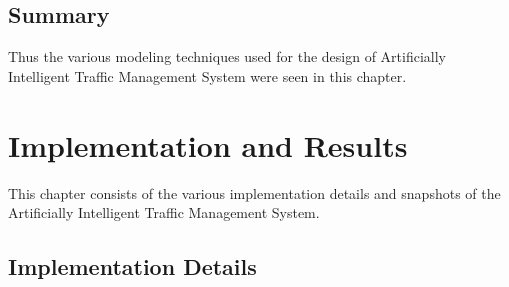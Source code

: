 \documentclass[openany,12pt]{report}
\begin{document}
	\section{Summary}
	\hspace*{0.5in}Thus the various modeling techniques used for the design of Artificially Intelligent Traffic Management System were seen in this chapter.
	
	
	
		
		\chapter{Implementation and Results}
		\hspace*{0.5in}This chapter consists of the various implementation details and snapshots of the Artificially Intelligent Traffic Management System.
		
		\section{Implementation Details}
		
\end{document}
